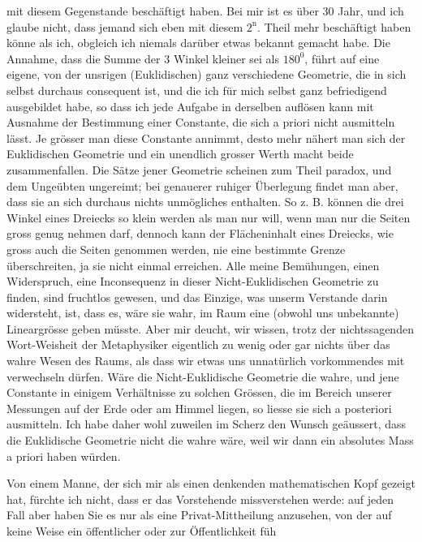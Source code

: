 mit diesem Gegenstande beschäftigt haben. Bei mir ist es über 30 Jahr, und ich glaube nicht,
dass jemand sich eben mit diesem $2^{\mathrm n}.$ Theil mehr beschäftigt haben könne als ich,
obgleich ich niemals darüber etwas bekannt gemacht habe. Die Annahme, dass die Summe der 3
Winkel kleiner sei als $180^{0}$, führt auf eine eigene, von der unsrigen (Euklidischen) ganz
verschiedene Geometrie, die in sich selbst durchaus consequent ist, und die ich für mich selbst
ganz befriedigend ausgebildet habe, so dass ich jede Aufgabe in derselben auflösen kann mit
Ausnahme der Bestimmung einer Constante, die sich a priori nicht ausmitteln lässt. Je grösser
man diese Constante annimmt, desto mehr nähert man sich der Euklidischen Geometrie und ein
unendlich grosser Werth macht beide zusammenfallen. Die Sätze jener Geometrie scheinen zum
Theil paradox, und dem Ungeübten ungereimt; bei genauerer ruhiger Überlegung findet man aber,
dass sie an sich durchaus nichts unmögliches enthalten. So z. B. können die drei Winkel eines
Dreiecks so klein werden als man nur will, wenn man nur die Seiten gross genug nehmen darf,
dennoch kann der Flächeninhalt eines Dreiecks, wie gross auch die Seiten genommen werden, nie
eine bestimmte Grenze überschreiten, ja sie nicht einmal erreichen. Alle meine Bemühungen,
einen Widerspruch, eine Inconsequenz in dieser Nicht-Euklidischen Geometrie zu finden, sind
fruchtlos gewesen, und das Einzige, was unserm Verstande darin widersteht, ist, dass es, wäre
sie wahr, im Raum eine  (obwohl uns unbekannte) Lineargrösse geben
müsste. Aber mir deucht, wir wissen, trotz der nichtssagenden Wort-Weisheit der Metaphysiker
eigentlich zu wenig oder gar nichts über das wahre Wesen des Raums, als dass wir etwas uns
unnatürlich vorkommendes mit  verwechseln dürfen. Wäre die
Nicht-Euklidische Geometrie die wahre, und jene Constante in einigem Verhältnisse zu solchen
Grössen, die im Bereich unserer Messungen auf der Erde oder am Himmel liegen, so liesse sie
sich a posteriori ausmitteln. Ich habe daher wohl zuweilen im Scherz den Wunsch geäussert,
dass die Euklidische Geometrie nicht die wahre wäre, weil wir dann ein absolutes Mass a priori
haben würden.

Von einem Manne, der sich mir als einen denkenden mathematischen Kopf gezeigt hat, fürchte ich
nicht, dass er das Vorstehende missverstehen werde: auf jeden Fall aber haben Sie es nur als
eine Privat-Mittheilung anzusehen, von der auf keine Weise ein öffentlicher oder zur
Öffentlichkeit füh%
